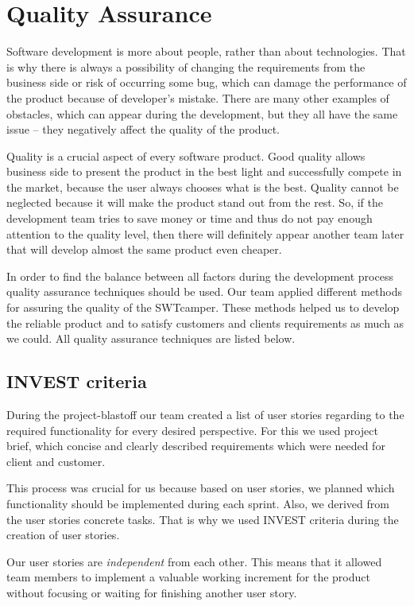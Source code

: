 \section{Quality Assurance}
\label{sec:quality_assurance}

Software development is more about people, rather than about technologies. That is why there is always a possibility of changing the requirements from the business side or risk of occurring some bug, which can damage the performance of the product because of developer’s mistake. There are many other examples of obstacles, which can appear during the development, but they all have the same issue – they negatively affect the quality of the product. 

Quality is a crucial aspect of every software product. Good quality allows business side to present the product in the best light and successfully compete in the market, because the user always chooses what is the best. Quality cannot be neglected because it will make the product stand out from the rest. So, if the development team tries to save money or time and thus do not pay enough attention to the quality level, then there will definitely appear another team later that will develop almost the same product even cheaper. 

In order to find the balance between all factors during the development process quality assurance techniques should be used. Our team applied different methods for assuring the quality of the SWTcamper. These methods helped us to develop the reliable product and to satisfy customers and clients requirements as much as we could. All quality assurance techniques are listed below.

\subsection{INVEST criteria}
During the project-blastoff our team created a list of user stories regarding to the required functionality for every desired perspective. For this we used project brief, which concise and clearly described requirements which were needed for client and customer.

This process was crucial for us because based on user stories, we planned which functionality should be implemented during each sprint. Also, we derived from the user stories concrete tasks. That is why we used INVEST criteria during the creation of user stories.

Our user stories are \emph{independent} from each other. This means that it allowed team members to implement a valuable working increment for the product without focusing or waiting for finishing another user story.

